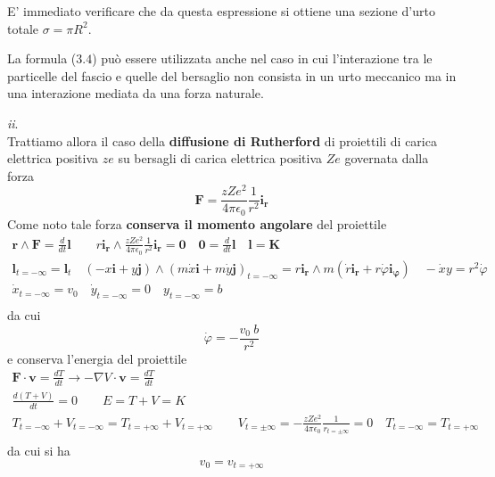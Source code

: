 E' immediato verificare che da questa espressione si ottiene una sezione d'urto totale $\sigma = \pi R^2$.


La formula ($3.4$) può essere utilizzata anche nel caso in cui l'interazione tra le particelle del fascio e quelle del bersaglio non consista in un urto meccanico ma in una interazione mediata da una forza naturale.

 \emph{ii}. \\

Trattiamo allora il caso della \textbf{diffusione di Rutherford} di proiettili di carica elettrica positiva $ze$ su bersagli di carica elettrica positiva $Ze$ governata dalla forza \[
	\bm{F} = \frac{zZe^2}{4 \pi \epsilon_0}\frac{1}{r^2}\bm{i_r}
\] Come noto tale forza \textbf{conserva il momento angolare} del proiettile \begin{gather*}
	\bm{r} \wedge \bm{F} = \frac{d}{dt}\bm{l} \qquad r \bm{i_r} \wedge \frac{zZe^2}{4 \pi \epsilon_0}\frac{1}{r^2}\bm{i_r} = \bm{0} \quad \bm{0} = \frac{d}{dt}\bm{l} \quad \bm{l}=\bm{K}\\
	\bm{l}_{t = - \infty} = \bm{l}_t \quad (-x \bm{i} + y \bm{j})\wedge(m \dot{x}\bm{i} + m\dot{y}\bm{j})_{t = - \infty} = r \bm{i_r} \wedge m(\dot{r}\bm{i_r} + r \dot{\varphi}\bm{i_{\varphi}}) \quad - \dot{x}y = r^2 \dot{\varphi}\\
	\dot{x}_{t = - \infty} = v_0 \quad \dot{y}_{t = - \infty} = 0 \quad y_{t = - \infty}= b\\
\end{gather*} da cui
\begin{equation}
	\dot{\varphi} = - \frac{v_0 \ b}{r^2}
\end{equation}
e conserva l'energia del proiettile
\begin{gather*}
	\bm{F} \cdot \bm{v} = \frac{dT}{dt} \rightarrow - \nabla V \cdot \bm{v} = \frac{dT}{dt}\\
	\frac{d(T + V)}{dt} = 0 \qquad E = T + V = K\\
	T_{t = - \infty}+ V_{t = - \infty} = T_{t = + \infty}+ V_{t = + \infty} \qquad V_{t = \pm \infty} =
	- \frac{zZe^2}{4 \pi \epsilon_0}\frac{1}{r_{t = \pm \infty}} = 0 \quad T_{t = - \infty}=T_{t = + \infty}\\
\end{gather*}
da cui si ha
\begin{equation}
	v_0 = v_{t = + \infty}
\end{equation}
